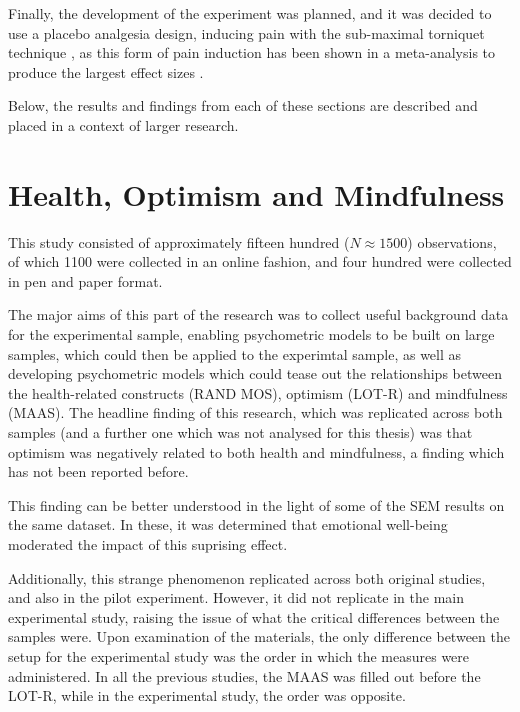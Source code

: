Finally, the development of the experiment was planned, and it was
decided to use a placebo analgesia design, inducing pain with the
sub-maximal torniquet technique \cite{moore1979submaximal}, as this
form of pain induction has been shown in a meta-analysis to produce
the largest effect sizes \cite{Sauro2005}.

Below, the results and findings from each of these sections are
described and placed in a context of larger research.

\section{Health, Optimism and Mindfulness}
\label{sec:health-optim-mindf}

This study consisted of approximately fifteen hundred ($N \approx
1500$) observations, of which 1100 were collected in an online
fashion, and four hundred were collected in pen and paper format.

The major aims of this part of the research was to collect useful
background data for the experimental sample, enabling psychometric
models to be built on large samples, which could then be applied to
the experimtal sample, as well as developing psychometric models which
could tease out the relationships between the health-related
constructs (RAND MOS), optimism (LOT-R) and mindfulness (MAAS). The
headline finding of this research, which was replicated across both
samples (and a further one which was not analysed for this thesis) was
that optimism was negatively related to both health and mindfulness, a
finding which has not been reported before.

This finding can be better understood in the light of some of the SEM
results on the same dataset. In these, it was determined that
emotional well-being moderated the impact of this suprising effect.


Additionally, this strange phenomenon replicated across both original
studies, and also in the pilot experiment. However, it did not
replicate in the main experimental study, raising the issue of what
the critical differences between the samples were. Upon examination of
the materials, the only difference between the setup for the
experimental study was the order in which the measures were
administered. In all the previous studies, the MAAS was filled out
before the LOT-R, while in the experimental study, the order was
opposite.

